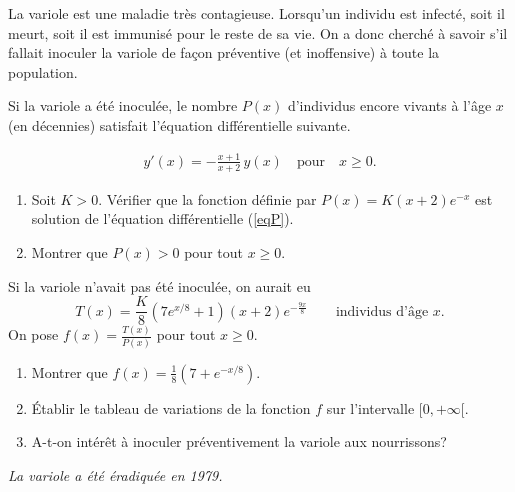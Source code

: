 \begin{exo}
    La variole est une maladie très contagieuse. Lorsqu'un individu est infecté, soit il meurt, soit il est immunisé pour le reste de sa vie. On a donc cherché à savoir s'il fallait inoculer la variole de façon préventive (et inoffensive) à toute la population.

    Si la variole a été inoculée, le nombre $P(x)$ d'individus encore vivants à l'âge $x$ (en décennies) satisfait l'équation différentielle suivante.

    \begin{eqnarray}\label{eqP}
        y'(x)=-\frac{x+1}{x+2}\,y(x)\quad\mathrm{pour}\quad x\ge 0.
    \end{eqnarray}

    \begin{enumerate}
        \item Soit $K>0$. Vérifier que la fonction définie par $P(x)=K(x+2)e^{-x}$ est solution de l'équation différentielle (\ref{eqP}).
        \item Montrer que $P(x)>0$ pour tout $x\ge 0$.
    \end{enumerate}

    \noindent Si la variole n'avait pas été inoculée, on aurait eu
    $$
        T(x)=\frac{K}{8}(7e^{x/8}+1)(x+2)e^{-\frac{9x}{8}} \qquad \text{individus d'âge } x.
    $$
    On pose $f(x)=\frac{T(x)}{P(x)}$ pour tout $x\ge 0$.

    \begin{enumerate}
        \item Montrer que $f(x)=\frac{1}{8}(7+e^{-x/8})$.
        \item Établir le tableau de variations de la fonction $f$ sur l'intervalle $[0,+\infty[$.
        \item A-t-on intérêt à inoculer préventivement la variole aux nourrissons?
    \end{enumerate}

    \textit{La variole a été éradiquée en 1979.}
\end{exo}

